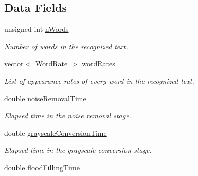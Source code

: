 \subsection*{Data Fields}
\begin{CompactItemize}
\item 
\hypertarget{struct_statistics_b8aec77e19e962544468c569a8333d15}{
unsigned int \hyperlink{struct_statistics_b8aec77e19e962544468c569a8333d15}{nWords}}
\label{struct_statistics_b8aec77e19e962544468c569a8333d15}

\begin{CompactList}\small\item\em Number of words in the recognized text. \item\end{CompactList}\item 
\hypertarget{struct_statistics_905896f578b6af9e46d82990e39480bd}{
vector$<$ \hyperlink{_word_rate_8h_e8f43926daba5798edbb3cb94ad07ff7}{WordRate} $>$ \hyperlink{struct_statistics_905896f578b6af9e46d82990e39480bd}{wordRates}}
\label{struct_statistics_905896f578b6af9e46d82990e39480bd}

\begin{CompactList}\small\item\em List of appearance rates of every word in the recognized text. \item\end{CompactList}\item 
\hypertarget{struct_statistics_4a194feb4de2fc619d311b2adb2a7e74}{
double \hyperlink{struct_statistics_4a194feb4de2fc619d311b2adb2a7e74}{noiseRemovalTime}}
\label{struct_statistics_4a194feb4de2fc619d311b2adb2a7e74}

\begin{CompactList}\small\item\em Elapsed time in the noise removal stage. \item\end{CompactList}\item 
\hypertarget{struct_statistics_fc22ca2705714cfc44c45c772475c1cb}{
double \hyperlink{struct_statistics_fc22ca2705714cfc44c45c772475c1cb}{grayscaleConversionTime}}
\label{struct_statistics_fc22ca2705714cfc44c45c772475c1cb}

\begin{CompactList}\small\item\em Elapsed time in the grayscale conversion stage. \item\end{CompactList}\item 
\hypertarget{struct_statistics_6c2cd48482d1de181cb2dd32b3315449}{
double \hyperlink{struct_statistics_6c2cd48482d1de181cb2dd32b3315449}{floodFillingTime}}
\label{struct_statistics_6c2cd48482d1de181cb2dd32b3315449}


\end{CompactItemize}
